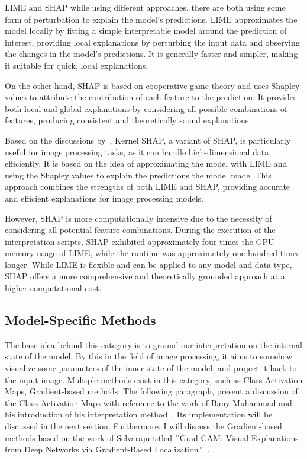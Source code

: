 LIME and SHAP while using
different approaches, there are both using some form of perturbation to explain the model's predictions.
LIME approximates the model locally by fitting a simple interpretable model around
the prediction of interest, providing local explanations by perturbing the input
data and observing the changes in the model's predictions.
It is generally faster and simpler, making it suitable for quick, local explanations.


On the other hand, SHAP is based on cooperative game theory and uses Shapley values to attribute the contribution of
each feature to the prediction.
It provides both local and global explanations by considering all possible combinations of features,
producing consistent and theoretically sound explanations.


Based on the discussions by~\cite{lundberg2017unifiedapproachinterpretingmodel}, Kernel SHAP, a variant of SHAP,
is particularly useful for image processing tasks, as it can handle high-dimensional data efficiently.
It is based on the idea of approximating the model with LIME and using the Shapley values to explain
the predictions the model made.
This approach combines the strengths of both LIME and SHAP, providing accurate and efficient explanations for
image processing models.

However, SHAP is more computationally intensive due to the necessity of considering all potential feature combinations. During the execution of the interpretation scripts, SHAP exhibited approximately four times the GPU memory usage of LIME, while the runtime was approximately one hundred times longer. While LIME is flexible and can be applied to any model and data type, SHAP offers a more comprehensive and theoretically grounded approach at a higher computational cost.

\subsection{Model-Specific Methods}\label{subsec:model-specific-methods}
The base idea behind this category is to ground our interpretation on the internal state of the model.
By this in the field of image processing, it aims to somehow visualize some parameters of the inner state of the model, and project it back to the input image.
Multiple methods exist in this category, such as Class Activation Maps, Gradient-based methods.
The following paragraph, present a discussion of the Class Activation Maps with reference to the work of Bany Muhammad and his introduction of his interpretation method~\cite{Muhammad_2020}.
Its implementation will be discussed in the next section.
Furthermore, I will discuss the Gradient-based methods based on the work of Selvaraju titled \("\)Grad-CAM: Visual
Explanations from Deep Networks via Gradient-Based Localization\("\)~\cite{Selvaraju_2019}.




